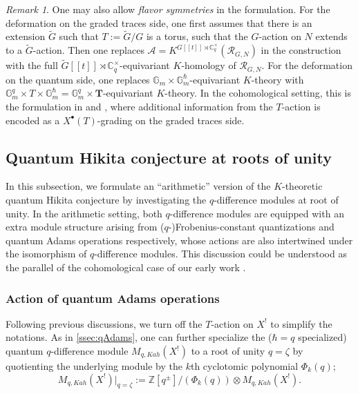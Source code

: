\documentclass[reqno]{amsart}
\numberwithin{equation}{section}
\numberwithin{equation}{section}
\numberwithin{equation}{section}
\theoremstyle{definition}
\theoremstyle{remark}
\theoremstyle{remark}
\newtheorem{rem}[thm]{Remark}
\begin{document}
\begin{rem}\label{rem:flavor-symmetry}
    One may also allow \emph{flavor symmetries} in the formulation. For the deformation on the graded traces side, one first assumes that there is an extension $\widetilde{G}$ such that $T := \widetilde{G}/G$ is a torus, such that the $G$-action on $N$ extends to a $\widetilde{G}$-action. Then one replaces $\mathcal{A} = K^{G[\![t]\!] \rtimes \mathbb{C}^\times_q} (\mathcal{R}_{G, N})$ in the construction with the full $\widetilde{G}[\![t]\!] \rtimes \mathbb{C}^\times_q$-equivariant $K$-homology of $\mathcal{R}_{G, N}$. For the deformation on the quantum side, one replaces $\mathbb{G}_m \times \mathbb{G}_m^\hbar$-equivariant $K$-theory with $\mathbb{G}_m^q \times T \times \mathbb{G}_m^\hbar = \mathbb{G}_m^q \times \mathbf{T}$-equivariant $K$-theory. In the cohomological setting, this is the formulation in \cite{KMP21} and \cite{bai-lee}, where additional information from the $T$-action is encoded as a $X^{\bullet}(T)$-grading on the graded traces side.
\end{rem}


\subsection{Quantum Hikita conjecture at roots of unity}\label{ssec:quantumHikita-formulation}
In this subsection, we formulate an ``arithmetic'' version of the $K$-theoretic quantum Hikita conjecture by investigating the $q$-difference modules at root of unity. In the arithmetic setting, both $q$-difference modules are equipped with an extra module structure arising from ($q$-)Frobenius-constant quantizations \cite[Section 4]{lonergan} and quantum Adams operations respectively, whose actions are also intertwined under the isomorphism of $q$-difference modules. This discussion could be understood as the parallel of the cohomological case of our early work \cite{bai-lee}.

\subsubsection{Action of quantum Adams operations}
Following previous discussions, we turn off the $T$-action on $X^!$ to simplify the notations. As in \cref{ssec:qAdams}, one can further specialize the ($\hbar = q$ specialized) quantum $q$-difference module $M_{q, Kah}(X^!)$ to a root of unity $q = \zeta$ by quotienting the underlying module by the $k$th cyclotomic polynomial $\Phi_k(q)$;
\begin{equation}
    M_{q,Kah}(X^!)|_{q=\zeta} := \mathbb{Z}[q^\pm]/(\Phi_k(q)) \otimes M_{q,Kah}(X^!).
\end{equation}
\end{document}
